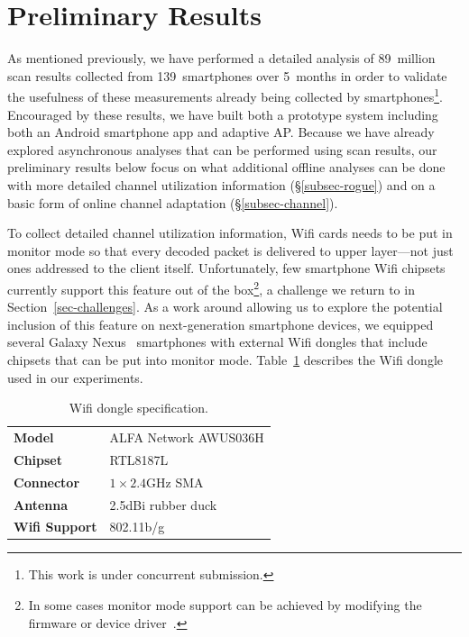 \section{Preliminary Results}
\label{sec-results}

As mentioned previously, we have performed a detailed analysis of 89~million
scan results collected from 139~smartphones over 5~months in order to
validate the usefulness of these measurements already being collected by
smartphones\footnote{This work is under concurrent submission.}. Encouraged
by these results, we have built both a prototype \PS{} system including both
an Android smartphone app and adaptive AP. Because we have already explored
asynchronous analyses that can be performed using scan results, our
preliminary results below focus on what additional offline analyses can be
done with more detailed channel utilization information
(\S\ref{subsec-rogue}) and on a basic form of online channel adaptation
(\S\ref{subsec-channel}).

To collect detailed channel utilization information, Wifi cards needs to be
put in monitor mode so that every decoded packet is delivered to upper
layer---not just ones addressed to the client itself. Unfortunately, few
smartphone Wifi chipsets currently support this feature out of the
box\footnote{In some cases monitor mode support can be achieved by modifying
the firmware or device driver~\cite{bmon}.}, a challenge we return to in
Section~\ref{sec-challenges}. As a work around allowing us to explore the
potential inclusion of this feature on next-generation smartphone devices, we
equipped several Galaxy Nexus~\cite{galaxynexus} smartphones with external
Wifi dongles that include chipsets that can be put into monitor mode.
Table~\ref{tab:dongle} describes the Wifi dongle used in our experiments.

\begin{table}[t!]
  \centering
  \begin{tabular}{ll}
    \toprule
    \textbf{Model} & ALFA Network AWUS036H \\
    \textbf{Chipset} & RTL8187L \\
    \textbf{Connector} & $1\times2.4$GHz SMA \\
    \textbf{Antenna} & 2.5dBi rubber duck \\
    \textbf{Wifi Support} & 802.11b/g \\
    \bottomrule
  \end{tabular}
  \caption{Wifi dongle specification.}
  \label{tab:dongle}
\end{table}


